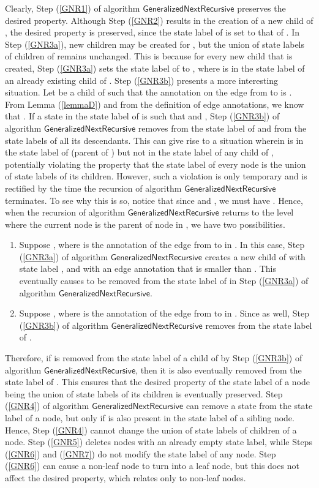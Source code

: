 \documentclass[3p]{elsarticle}
\newcommand{\algo}[1]{\ensuremath{\textsf{{#1}}}}
\begin{document}
Clearly, Step (\ref{GNR1}) of algorithm
\algo{GeneralizedNextRecursive} preserves the desired property.
Although Step (\ref{GNR2}) results in the creation of a new child 
of , the desired property is preserved, since the state label of
 is set to that of .  In Step (\ref{GNR3a}), new children may
be created for , but the union of state labels of children of 
remains unchanged.  This is because for every new child  that is
created, Step (\ref{GNR3a}) sets the state label of  to ,
where  is in the state label of an already existing child of .
Step (\ref{GNR3b}) presents a more interesting situation.  Let 
be a child of  such that the annotation on the edge from  to
 is .  From Lemma (\ref{lemmaD}) and from the definition of
edge annotations, we know that .  If a state  in the state label of  is such that  and , Step (\ref{GNR3b}) of
algorithm \algo{GeneralizedNextRecursive} removes  from the state
label of  and from the state labels of all its descendants.  This
can give rise to a situation wherein  is in the state label of 
(parent of ) but not in the state label of any child of ,
potentially violating the property that the state label of every node
is the union of state labels of its children. However, such a
violation is only temporary and is rectified by the time the recursion
of algorithm \algo{GeneralizedNextRecursive} terminates.  To see why
this is so, notice that since  and , we must have .  Hence, when the recursion of
algorithm \algo{GeneralizedNextRecursive} returns to the level where
the current node is the parent  of node  in , we have
two possibilities.
\begin{enumerate}
\item Suppose , where  is the annotation of the edge
  from  to  in .  In this case, Step (\ref{GNR3a}) of
  algorithm \algo{GeneralizedNextRecursive} creates a new child 
  of  with state label , and with an edge annotation that is
  smaller than .  This eventually causes  to be removed from the
  state label of  in Step (\ref{GNR3a}) of algorithm
  \algo{GeneralizedNextRecursive}.

\item Suppose , where  is the annotation of the edge
  from  to  in .  Since  as
  well, Step (\ref{GNR3b}) of algorithm
  \algo{GeneralizedNextRecursive} removes  from the state label of
  .
\end{enumerate}
Therefore, if  is removed from the state label of a child  of
 by Step (\ref{GNR3b}) of algorithm
\algo{GeneralizedNextRecursive}, then it is also eventually removed
from the state label of .  This ensures that the desired property
of the state label of a node being the union of state labels of its
children is eventually preserved.  Step (\ref{GNR4}) of algorithm
\algo{GeneralizedNextRecursive} can remove a state  from the state
label of a node, but only if  is also present in the state label of
a sibling node.  Hence, Step (\ref{GNR4}) cannot change the union of
state labels of children of a node.  Step (\ref{GNR5}) deletes nodes
with an already empty state label, while Steps (\ref{GNR6}) and (\ref{GNR7})
do not modify the state label of any node.  Step (\ref{GNR6}) can
cause a non-leaf node to turn into a leaf node, but this does not
affect the desired property, which relates only to non-leaf nodes.
\end{document}
